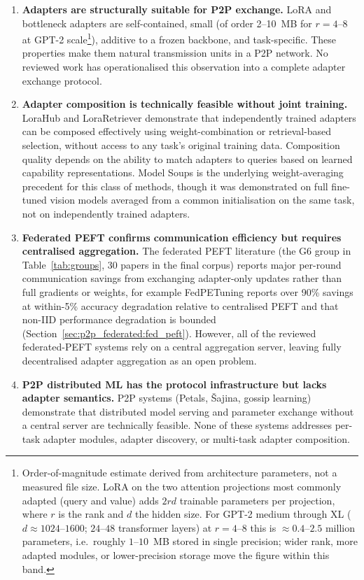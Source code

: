 \begin{enumerate}
  \item \textbf{Adapters are structurally suitable for P2P exchange.} LoRA and
    bottleneck adapters are self-contained, small (of order 2--10~MB for
    $r = 4$--$8$ at GPT-2 scale\footnote{Order-of-magnitude estimate derived
    from architecture parameters, not a measured file size. LoRA on the two
    attention projections most commonly adapted (query and value) adds $2rd$
    trainable parameters per projection, where $r$ is the rank and $d$ the
    hidden size. For GPT-2 medium through XL ($d \approx 1024$--$1600$;
    $24$--$48$ transformer layers) at $r = 4$--$8$ this is $\approx 0.4$--$2.5$
    million parameters, i.e.\ roughly $1$--$10$~MB stored in single precision;
    wider rank, more adapted modules, or lower-precision storage move the figure
    within this band.}), additive to a frozen backbone, and task-specific. These properties
    make them natural transmission units in a P2P network. No reviewed work has operationalised this observation into a complete adapter exchange protocol.

  \item \textbf{Adapter composition is technically feasible without joint training.}
    LoraHub \cite{Huang2023} and LoraRetriever \cite{ZhaoLoraRetriever2024} demonstrate
    that independently trained adapters can be composed effectively using
    weight-combination or retrieval-based selection, without access to any task's
    original training data. Composition quality
    depends on the ability to match adapters to queries based on learned capability
    representations. Model Soups \cite{Wortsman2022} is the underlying weight-averaging
    precedent for this class of methods, though it was demonstrated on full
    fine-tuned vision models averaged from a common initialisation on the same
    task, not on independently trained adapters.

  \item \textbf{Federated PEFT confirms communication efficiency but requires
    centralised aggregation.} The federated PEFT literature (the G6 group in
    Table~\ref{tab:groups}, 30 papers in the final corpus) reports major
    per-round communication savings from exchanging adapter-only updates rather
    than full gradients or weights, for example FedPETuning reports over
    90\% savings at within-5\% accuracy degradation relative to centralised PEFT
    \cite{ZhangFedPETuning2023} and that non-IID performance degradation is
    bounded (Section~\ref{sec:p2p_federated:fed_peft}).
    However, all of the reviewed federated-PEFT systems rely on a central
    aggregation server, leaving fully decentralised adapter aggregation as an
    open problem.

  \item \textbf{P2P distributed ML has the protocol infrastructure but lacks adapter
    semantics.} P2P systems (Petals, Šajina, gossip learning) demonstrate that
    distributed model serving and parameter exchange without a central server are
    technically feasible. None of these systems addresses per-task adapter modules,
    adapter discovery, or multi-task adapter composition.
\end{enumerate}

